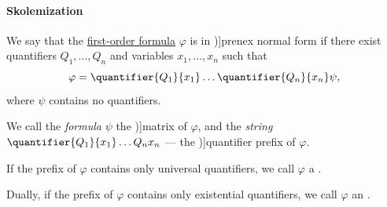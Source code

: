 \paragraph{Skolemization}

\begin{definition}\label{def:fol_prenex_normal_form}
  We say that the \hyperref[def:fol_formula]{first-order formula} \( \varphi \) is in \term[ru=предварённая / пренексная нормальная форма (\cite[def. 2.5.1]{Герасимов2014Вычислимость})]{prenex normal form} if there exist quantifiers \( Q_1, \ldots, Q_n \) and variables \( x_1, \ldots, x_n \) such that
  \begin{equation*}
    \varphi = \quantifier {Q_1} {x_1} \ldots \quantifier {Q_n} {x_n} \psi,
  \end{equation*}
  where \( \psi \) contains no quantifiers.

  We call the \emph{formula} \( \psi \) the \term[ru=матрица (\cite[def. 2.5.1]{Герасимов2014Вычислимость})]{matrix} of \( \varphi \), and the \emph{string} \( \quantifier {Q_1} {x_1} \ldots {Q_n} {x_n} \) --- the \term[en=prefix (\cite[def. 2.2.33]{Hinman2005Logic})]{quantifier prefix} of \( \varphi \).

  \begin{thmenum}
     If the prefix of \( \varphi \) contains only universal quantifiers, we call \( \varphi \) a .

     Dually, if the prefix of \( \varphi \) contains only existential quantifiers, we call \( \varphi \) an .
  \end{thmenum}
\end{definition}

